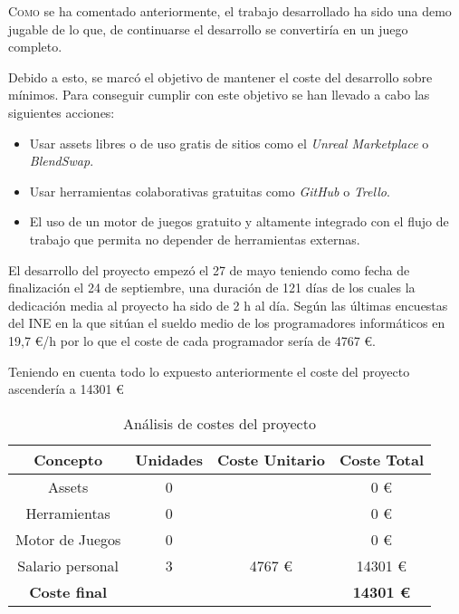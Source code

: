 \lettrine[lines=2,findent=2pt,nindent=3pt,loversize=0.1]{\textcolor[gray]{0.4}{C}}{omo} se ha comentado anteriormente, el trabajo desarrollado ha sido una demo jugable de lo que, de continuarse el desarrollo se convertiría en un juego completo.

Debido a esto, se marcó el objetivo de mantener el coste del desarrollo sobre mínimos. Para conseguir cumplir con este objetivo se han llevado a cabo las siguientes acciones:
\begin{itemize}
	\item Usar assets libres o de uso gratis de sitios como el \textit{Unreal Marketplace} o \textit{BlendSwap}.
	\item Usar herramientas colaborativas gratuitas como \textit{GitHub} o \textit{Trello}.
	\item El uso de un motor de juegos gratuito y altamente integrado con el flujo de trabajo que permita no depender de herramientas externas.
\end{itemize}

El desarrollo del proyecto empezó el 27 de mayo teniendo como fecha de finalización el 24 de septiembre, una duración de 121 días de los cuales la dedicación media al proyecto ha sido de 2 h al día. 
Según las últimas encuestas del INE \cite{15} en la que sitúan el sueldo medio de los programadores informáticos en 19,7 \euro/h por lo que el coste de cada programador sería de 4767 \euro.

Teniendo en cuenta todo lo expuesto anteriormente el coste del proyecto ascendería a 14301 \euro \\

\begin{table}[!h]
\centering
\begin{tabular}{cccc}
\hline
\textbf{Concepto} & \textbf{Unidades} & \textbf{Coste Unitario} & \textbf{Coste Total} \\ \hline
Assets            & 0                 &                         & 0 \euro                  \\ \hline
Herramientas      & 0                 &                         & 0 \euro                  \\ \hline
Motor de Juegos   & 0                 &                         & 0 \euro                  \\ \hline
Salario personal  & 3                 & 4767 \euro                    & 14301 \euro               \\ \hline
\textbf{Coste final}       &                   &                         & \textbf{14301 \euro}               \\ \hline
\end{tabular}
\caption{Análisis de costes del proyecto}
\end{table}
